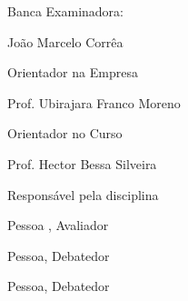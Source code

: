 
%
% 
%
\begin{folhadeaprovacao}


\thispagestyle{empty}

{\large Banca Examinadora:}

\vspace{1.3cm}

\begin{flushright}

{\large João Marcelo Corrêa}

{\large Orientador na Empresa}

\vspace{1.2cm}
{\large Prof. Ubirajara Franco Moreno}

{\large Orientador no Curso}

\vspace{1.2cm}
 
{\large Prof. Hector Bessa Silveira}

{\large Responsável pela disciplina}

\vspace{1cm}

{\large Pessoa , Avaliador}

\vspace{0.8cm}

{\large Pessoa, Debatedor}

\vspace{0.8cm}

{\large Pessoa, Debatedor}

\end{flushright}
  
\end{folhadeaprovacao}